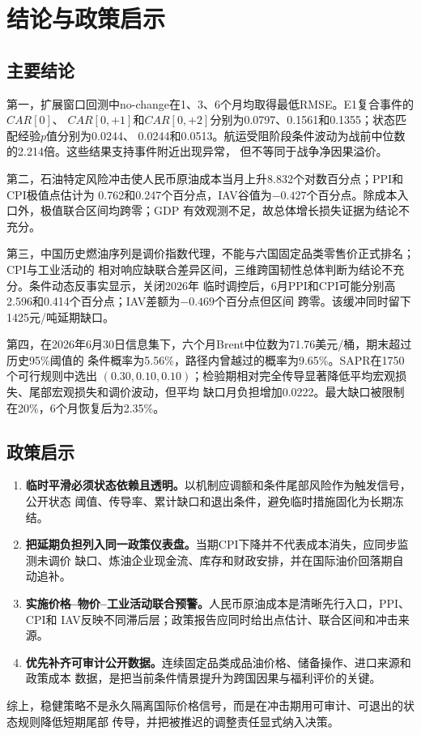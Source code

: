 \section{结论与政策启示}

\subsection{主要结论}

第一，扩展窗口回测中no-change在1、3、6个月均取得最低RMSE。E1复合事件的$CAR[0]$、
$CAR[0,+1]$和$CAR[0,+2]$分别为0.0797、0.1561和0.1355；状态匹配经验$p$值分别为0.0244、
0.0244和0.0513。航运受阻阶段条件波动为战前中位数的2.214倍。这些结果支持事件附近出现异常，
但不等同于战争净因果溢价。

第二，石油特定风险冲击使人民币原油成本当月上升8.832个对数百分点；PPI和CPI极值点估计为
0.762和0.247个百分点，IAV谷值为$-0.427$个百分点。除成本入口外，极值联合区间均跨零；GDP
有效观测不足，故总体增长损失证据为结论不充分。

第三，中国历史燃油序列是调价指数代理，不能与六国固定品类零售价正式排名；CPI与工业活动的
相对响应缺联合差异区间，三维跨国韧性总体判断为结论不充分。条件动态反事实显示，关闭2026年
临时调控后，6月PPI和CPI可能分别高2.596和0.414个百分点；IAV差额为$-0.469$个百分点但区间
跨零。该缓冲同时留下1425元/吨延期缺口。

第四，在2026年6月30日信息集下，六个月Brent中位数为71.76美元/桶，期末超过历史95\%阈值的
条件概率为5.56\%，路径内曾越过的概率为9.65\%。SAPR在1750个可行规则中选出
$(0.30,0.10,0.10)$；检验期相对完全传导显著降低平均宏观损失、尾部宏观损失和调价波动，但平均
缺口月负担增加0.0222。最大缺口被限制在20\%，6个月恢复后为2.35\%。

\subsection{政策启示}

\begin{enumerate}
  \item \textbf{临时平滑必须状态依赖且透明。}以机制应调额和条件尾部风险作为触发信号，公开状态
  阈值、传导率、累计缺口和退出条件，避免临时措施固化为长期冻结。
  \item \textbf{把延期负担列入同一政策仪表盘。}当期CPI下降并不代表成本消失，应同步监测未调价
  缺口、炼油企业现金流、库存和财政安排，并在国际油价回落期自动追补。
  \item \textbf{实施价格--物价--工业活动联合预警。}人民币原油成本是清晰先行入口，PPI、CPI和
  IAV反映不同滞后层；政策报告应同时给出点估计、联合区间和冲击来源。
  \item \textbf{优先补齐可审计公开数据。}连续固定品类成品油价格、储备操作、进口来源和政策成本
  数据，是把当前条件情景提升为跨国因果与福利评价的关键。
\end{enumerate}

综上，稳健策略不是永久隔离国际价格信号，而是在冲击期用可审计、可退出的状态规则降低短期尾部
传导，并把被推迟的调整责任显式纳入决策。
